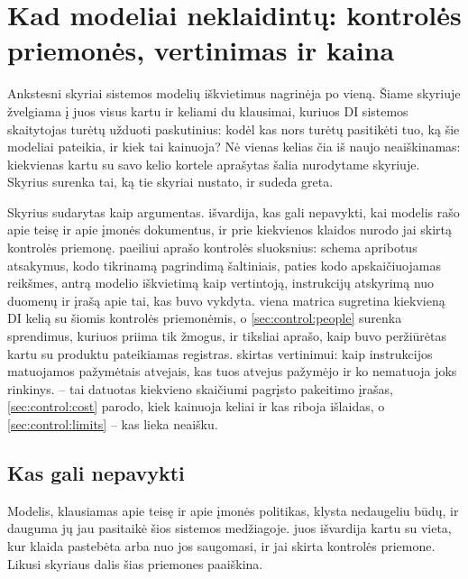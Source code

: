 \chapter{Kad modeliai neklaidintų: kontrolės priemonės, vertinimas ir kaina}\label{ch:control}

Ankstesni skyriai sistemos modelių iškvietimus nagrinėja po vieną. Šiame skyriuje žvelgiama
į juos visus kartu ir keliami du klausimai, kuriuos DI sistemos skaitytojas turėtų užduoti
paskutinius: kodėl kas nors turėtų pasitikėti tuo, ką šie modeliai pateikia, ir kiek tai
kainuoja? Nė vienas kelias čia iš naujo neaiškinamas: kiekvienas kartu su savo kelio kortele
aprašytas šalia nurodytame skyriuje. Skyrius surenka tai, ką tie skyriai nustato, ir sudeda
greta.

Skyrius sudarytas kaip argumentas.  išvardija, kas gali nepavykti,
kai modelis rašo apie teisę ir apie įmonės dokumentus, ir prie kiekvienos klaidos nurodo jai
skirtą kontrolės priemonę.  paeiliui aprašo kontrolės sluoksnius:
schema apribotus atsakymus, kodo tikrinamą pagrindimą šaltiniais, paties kodo apskaičiuojamas
reikšmes, antrą modelio iškvietimą kaip vertintoją, instrukcijų atskyrimą nuo duomenų ir
įrašą apie tai, kas buvo vykdyta.  viena matrica sugretina kiekvieną
DI kelią su šiomis kontrolės priemonėmis, o \cref{sec:control:people} surenka sprendimus,
kuriuos priima tik žmogus, ir tiksliai aprašo, kaip buvo peržiūrėtas kartu su produktu
pateikiamas registras.  skirtas vertinimui: kaip instrukcijos
matuojamos pažymėtais atvejais, kas tuos atvejus pažymėjo ir ko nematuoja joks rinkinys.
 -- tai datuotas kiekvieno skaičiumi pagrįsto pakeitimo įrašas,
\cref{sec:control:cost} parodo, kiek kainuoja keliai ir kas riboja išlaidas, o
\cref{sec:control:limits} -- kas lieka neaišku.


\section{Kas gali nepavykti}\label{sec:control:risks}

Modelis, klausiamas apie teisę ir apie įmonės politikas, klysta nedaugeliu būdų, ir dauguma
jų jau pasitaikė šios sistemos medžiagoje.  juos išvardija kartu su
vieta, kur klaida pastebėta arba nuo jos saugomasi, ir jai skirta kontrolės priemone. Likusi
skyriaus dalis šias priemones paaiškina.

